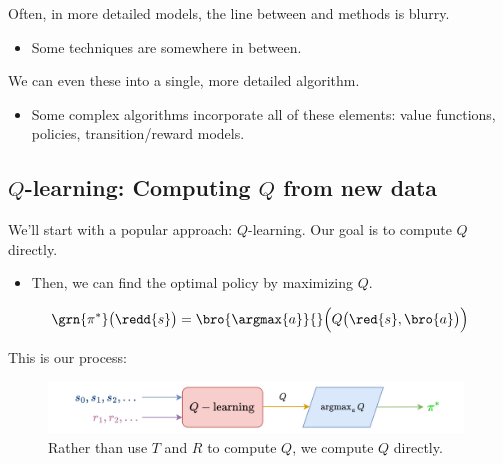     \begin{clarification}
        Often, in more detailed models, the line between  and  methods is blurry.

        \begin{itemize}
            \item Some techniques are somewhere in between.
        \end{itemize}

        We can even  these into a single, more detailed algorithm.

        \begin{itemize}
            \item Some complex algorithms incorporate all of these elements: value functions, policies, transition/reward models.
        \end{itemize}
    \end{clarification}





    \pagebreak

    \subsection{$Q$-learning: Computing $Q$ from new data}

        We'll start with a popular  approach: $Q$-learning. Our goal is to compute $Q$ directly. 
        
        \begin{itemize}
            \item Then, we can find the optimal policy by maximizing $Q$.
        \end{itemize}

        \begin{equation*}
            \grn{\pi^*}\big(\redd{s}\big) = 
            \bro{\argmax{a}}{} \Big( 
                Q\big(\red{s}, \bro{a} \big) 
            \Big)
        \end{equation*}

        This is our process:

        \begin{figure}[H]
            \centering
            \includegraphics[width=110mm,scale=0.5]{images/rl_images/q_learning.png}
            \caption*{Rather than use $T$ and $R$ to compute $Q$, we compute $Q$ directly.}
        \end{figure}

